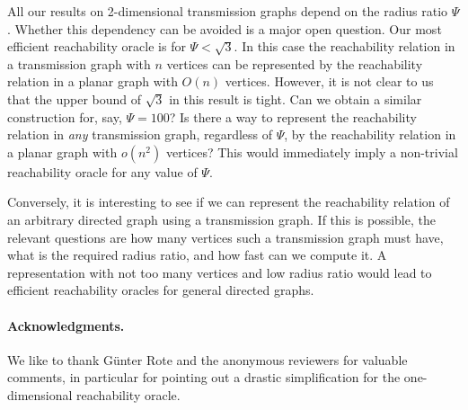 \documentclass[11pt,a4paper]{paper}
\begin{document}
All our results on 2-dimensional transmission graphs depend on the radius ratio $\Psi$.
Whether this dependency can be avoided is a major open question.
Our most efficient reachability oracle is for $\Psi < \sqrt{3}$. In this case
the reachability relation in a transmission graph with $n$ vertices can be represented
by the reachability relation in a planar graph with $O(n)$ vertices.
However, it is not clear to us that the upper bound of $\sqrt{3}$ in this result is
tight.
Can we obtain a similar construction for, say, $\Psi = 100$? Is there
 a way to represent the reachability relation in \emph{any} transmission graph, regardless of $\Psi$,
by the reachability relation in a planar graph with $o(n^{2})$ vertices?
This would immediately imply a non-trivial reachability oracle for any value
of $\Psi$.

Conversely, it is interesting to see if we can represent
the reachability relation of an arbitrary directed graph
using a transmission graph. If this is possible, the relevant questions
are how many vertices such a transmission graph must have, what is the required
radius ratio, and how fast can we compute it. A representation with not too many
vertices and low radius ratio would lead to efficient reachability oracles for
general directed graphs.

\paragraph*{Acknowledgments.}
We like to thank G\"unter Rote and the anonymous reviewers 
for valuable comments, in particular for pointing out a
drastic simplification for the one-dimensional reachability oracle.



\end{document}
